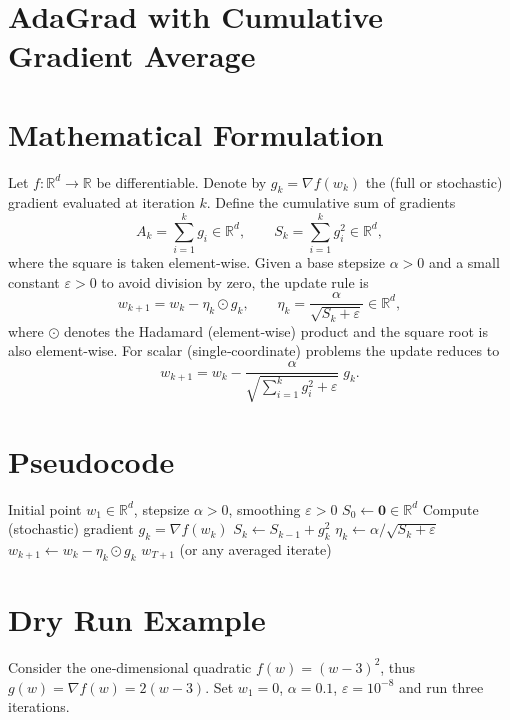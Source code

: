\documentclass{article}
\newcommand{\R}{\mathbb{R}}
\begin{document}
\section*{AdaGrad with Cumulative Gradient Average}

\section*{Mathematical Formulation}
Let $f:\R^{d}\rightarrow\R$ be differentiable.  
Denote by $g_{k}=\nabla f(w_{k})$ the (full or stochastic) gradient evaluated at iteration $k$.  
Define the cumulative sum of gradients
\[
A_{k}= \sum_{i=1}^{k} g_{i}\in\R^{d},
\qquad 
S_{k}= \sum_{i=1}^{k} g_{i}^{2}\in\R^{d},
\]
where the square is taken element‑wise.  
Given a base stepsize $\alpha>0$ and a small constant $\varepsilon>0$ to avoid division by zero, the update rule is
\[
\boxed{
w_{k+1}= w_{k}-\eta_{k}\odot g_{k},
\qquad 
\eta_{k}= \frac{\alpha}{\sqrt{S_{k}+\varepsilon}}\in\R^{d},
}
\tag{1}
\]
where $\odot$ denotes the Hadamard (element‑wise) product and the square root is also element‑wise.  
For scalar (single‑coordinate) problems the update reduces to
\[
w_{k+1}= w_{k}-\frac{\alpha}{\sqrt{\sum_{i=1}^{k} g_{i}^{2}+\varepsilon}}\;g_{k}.
\tag{2}
\]

\section*{Pseudocode}
\begin{algorithm}[H]
\caption{AdaGrad with Cumulative Gradient Average}
\begin{algorithmic}[1]
\Require Initial point $w_{1}\in\R^{d}$, stepsize $\alpha>0$, smoothing $\varepsilon>0$
\State $S_{0}\gets \mathbf{0}\in\R^{d}$ 
    \State Compute (stochastic) gradient $g_{k}= \nabla f(w_{k})$
    \State $S_{k}\gets S_{k-1}+ g_{k}^{2}$ 
    \State $\eta_{k}\gets \alpha\big/ \sqrt{S_{k}+\varepsilon}$ 
    \State $w_{k+1}\gets w_{k}-\eta_{k}\odot g_{k}$
\EndFor
\State \Return $w_{T+1}$ (or any averaged iterate)
\end{algorithmic}
\end{algorithm}

\section*{Dry Run Example}
Consider the one‑dimensional quadratic $f(w)=(w-3)^{2}$, thus $g(w)=\nabla f(w)=2(w-3)$.  
Set $w_{1}=0$, $\alpha=0.1$, $\varepsilon=10^{-8}$ and run three iterations.
\end{document}

